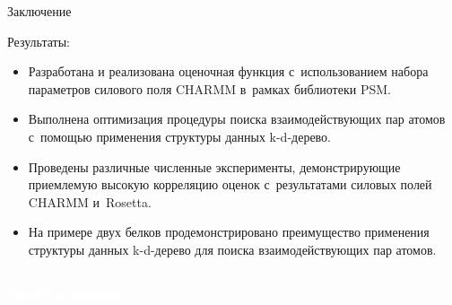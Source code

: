\documentclass[sans,aspectratio=169]{beamer}
\begin{document}
\begin{frame}{Заключение}
	\fontsize{11}{12}\selectfont
	\hangindent=-0.5cm
	 \noindent
	\setlength{\leftmargini}{20pt}
	
	\vspace{-5pt}

Результаты:
\begin{itemize}
	\item Разработана и реализована оценочная функция с~использованием набора параметров силового поля CHARMM в~рамках библиотеки PSM. 
	\item Выполнена оптимизация процедуры поиска взаимодействующих пар атомов с~помощью применения структуры данных k-d-дерево.
	\item Проведены различные численные эксперименты, демонстрирующие приемлемую высокую корреляцию оценок с~результатами силовых полей CHARMM и~Rosetta.
	\item На примере двух белков продемонстрировано преимущество применения структуры данных k-d-дерево для поиска взаимодействующих пар атомов.
\end{itemize}

\end{frame}



\begin{frame}
	\fontsize{20}{25}\selectfont
	
	
	\begin{columns}[c]
		\centering
		
		\begin{exampleblock}{}
			{
				\vskip3mm
				\begin{center}
					\textcolor{white}{Спасибо за внимание!}
				\end{center}
				\vskip5mm
			}
		\end{exampleblock}
		
	\end{columns}
	
\end{frame}
\end{document}
